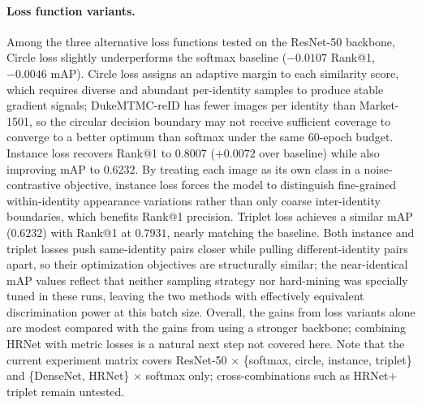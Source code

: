 \documentclass[sigconf,nonacm]{acmart}
\begin{document}
\paragraph{Loss function variants.}
Among the three alternative loss functions tested on the ResNet-50 backbone, Circle loss slightly underperforms the softmax baseline ($-0.0107$ Rank@1, $-0.0046$ mAP).
Circle loss assigns an adaptive margin to each similarity score, which requires diverse and abundant per-identity samples to produce stable gradient signals; DukeMTMC-reID has fewer images per identity than Market-1501, so the circular decision boundary may not receive sufficient coverage to converge to a better optimum than softmax under the same 60-epoch budget.
Instance loss recovers Rank@1 to $0.8007$ ($+0.0072$ over baseline) while also improving mAP to $0.6232$.
By treating each image as its own class in a noise-contrastive objective, instance loss forces the model to distinguish fine-grained within-identity appearance variations rather than only coarse inter-identity boundaries, which benefits Rank@1 precision.
Triplet loss achieves a similar mAP ($0.6232$) with Rank@1 at $0.7931$, nearly matching the baseline.
Both instance and triplet losses push same-identity pairs closer while pulling different-identity pairs apart, so their optimization objectives are structurally similar; the near-identical mAP values reflect that neither sampling strategy nor hard-mining was specially tuned in these runs, leaving the two methods with effectively equivalent discrimination power at this batch size.
Overall, the gains from loss variants alone are modest compared with the gains from using a stronger backbone; combining HRNet with metric losses is a natural next step not covered here.
Note that the current experiment matrix covers ResNet-50 $\times$ \{softmax, circle, instance, triplet\} and \{DenseNet, HRNet\} $\times$ softmax only; cross-combinations such as HRNet$+$triplet remain untested.
\end{document}
